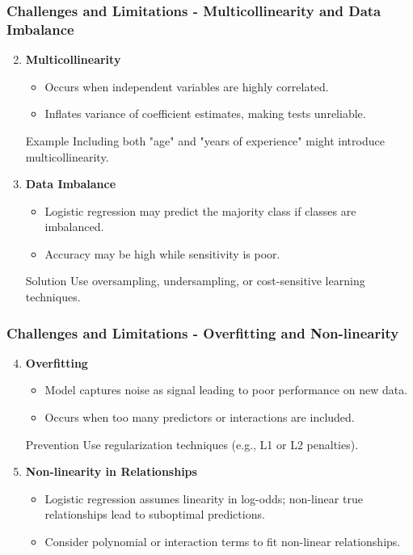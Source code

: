 \documentclass[aspectratio=169]{beamer}
\begin{document}
\begin{frame}[fragile]
    \frametitle{Challenges and Limitations - Multicollinearity and Data Imbalance}
    \begin{enumerate}
        \setcounter{enumi}{1}
        \item \textbf{Multicollinearity}
        \begin{itemize}
            \item Occurs when independent variables are highly correlated.
            \item Inflates variance of coefficient estimates, making tests unreliable.
        \end{itemize}
        \begin{block}{Example}
            Including both "age" and "years of experience" might introduce multicollinearity.
        \end{block}
        
        \item \textbf{Data Imbalance}
        \begin{itemize}
            \item Logistic regression may predict the majority class if classes are imbalanced.
            \item Accuracy may be high while sensitivity is poor.
        \end{itemize}
        \begin{block}{Solution}
            Use oversampling, undersampling, or cost-sensitive learning techniques.
        \end{block}
    \end{enumerate}
\end{frame}

\begin{frame}[fragile]
    \frametitle{Challenges and Limitations - Overfitting and Non-linearity}
    \begin{enumerate}
        \setcounter{enumi}{3}
        \item \textbf{Overfitting}
        \begin{itemize}
            \item Model captures noise as signal leading to poor performance on new data.
            \item Occurs when too many predictors or interactions are included.
        \end{itemize}
        \begin{block}{Prevention}
            Use regularization techniques (e.g., L1 or L2 penalties).
        \end{block}
        
        \item \textbf{Non-linearity in Relationships}
        \begin{itemize}
            \item Logistic regression assumes linearity in log-odds; non-linear true relationships lead to suboptimal predictions.
            \item Consider polynomial or interaction terms to fit non-linear relationships.
        \end{itemize}
    \end{enumerate}
\end{frame}
\end{document}
